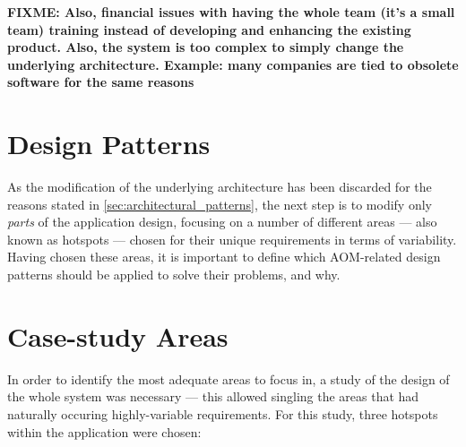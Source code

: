 \textbf{FIXME: Also, financial issues with having the whole team (it's a small team) training instead of developing and enhancing the existing product. Also, the system is too complex to simply change the underlying architecture. Example: many companies are tied to obsolete software for the same reasons}

\section{Design Patterns}\label{sec:design_patterns}

As the modification of the underlying architecture has been discarded for the reasons stated in \ref{sec:architectural_patterns}, the next step is to modify only \emph{parts} of the application design, focusing on a number of different areas --- also known as hotspots --- chosen for their unique requirements in terms of variability. Having chosen these areas, it is important to define which AOM-related design patterns should be applied to solve their problems, and why.

\section{Case-study Areas}\label{sec:case-study_areas}

In order to identify the most adequate areas to focus in, a study of the design of the whole system was necessary --- this allowed singling the areas that had naturally occuring highly-variable requirements. For this study, three hotspots within the application were chosen:

